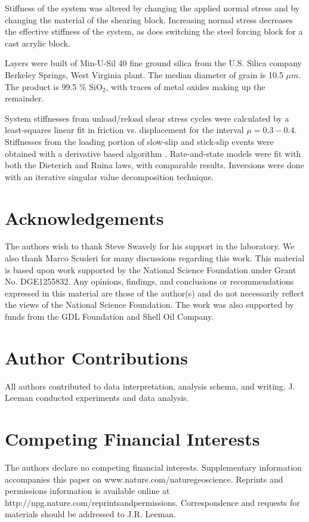 \documentclass[11pt]{article}
\begin{document}
Stiffness of the system was altered by changing the applied normal stress and by
changing the material of the shearing block. Increasing normal stress decreases
the effective stiffness of the system, as does switching the steel forcing block
for a cast acrylic block.

Layers were built of Min-U-Sil\textsuperscript{\textregistered} 40 fine ground
silica from the U.S. Silica\textsuperscript{\textregistered} company Berkeley
Springs, West Virginia plant. The median diameter of grain is 10.5 $\mu m$. The
product is 99.5 \% SiO$_2$, with traces of metal oxides making up the remainder.

System stiffnesses from unload/reload shear stress cycles were calculated by a
least-squares linear fit in friction vs. displacement for the interval $\mu =
0.3-0.4$. Stiffnesses from the loading portion of slow-slip and stick-slip
events were obtained with a derivative based algorithm \cite{Leeman:2015}.
Rate-and-state models were fit with both the Dieterich and
Ruina laws, with comparable results. Inversions were done with an iterative
singular value decomposition technique.



\section{Acknowledgements}
The authors wish to thank Steve Swavely for his support in the laboratory.
We also thank Marco Scuderi for many discussions regarding this work. This
material is based upon work supported by the National Science Foundation under
Grant No. DGE1255832.  Any opinions, findings, and conclusions or
recommendations expressed in this material are those of the author(s) and do not
necessarily reflect the views of the National Science Foundation. The work was
also supported by funds from the GDL Foundation and Shell Oil Company.

\section{Author Contributions}
All authors contributed to data interpretation, analysis schema, and writing.
J. Leeman conducted experiments and data analysis.

\section{Competing Financial Interests}
The authors declare no competing financial interests. Supplementary information
accompanies this paper on www.nature.com/naturegeoscience. Reprints and permissions information is
available online at http://npg.nature.com/reprintsandpermissions. Correspondence
and requests for materials should be addressed to J.R. Leeman.
\end{document}
